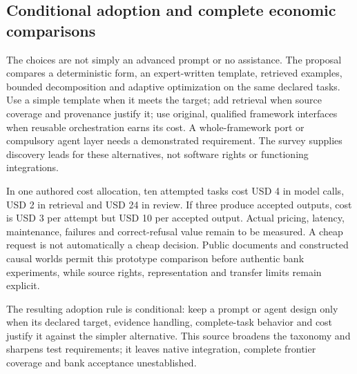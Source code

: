 \subsection{Conditional adoption and complete economic comparisons}

The choices are not simply an advanced prompt or no assistance. The proposal
compares a deterministic form, an expert-written template, retrieved examples,
bounded decomposition and adaptive optimization on the same declared tasks.
Use a simple template when it meets the target; add retrieval when source
coverage and provenance justify it; use original, qualified framework interfaces
when reusable orchestration earns its cost. A whole-framework port or compulsory
agent layer needs a demonstrated requirement. The survey supplies discovery
leads for these alternatives, not software rights or functioning integrations.

In one authored cost allocation, ten attempted tasks cost USD 4 in model calls,
USD 2 in retrieval and USD 24 in review. If three produce accepted outputs,
cost is USD 3 per attempt but USD 10 per accepted output. Actual pricing,
latency, maintenance, failures and correct-refusal value remain to be measured.
A cheap request is not automatically a cheap decision. Public documents and
constructed causal worlds permit this prototype comparison before authentic
bank experiments, while source rights, representation and transfer limits remain
explicit.~\citep{exec24_promptengineering_reference}

The resulting adoption rule is conditional: keep a prompt or agent design only
when its declared target, evidence handling, complete-task behavior and cost
justify it against the simpler alternative. This source broadens the taxonomy
and sharpens test requirements; it leaves native integration, complete frontier
coverage and bank acceptance unestablished.
